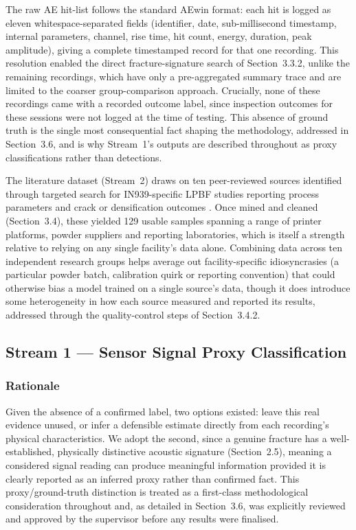 \documentclass[a4paper]{article}
\begin{document}
The raw AE hit-list follows the standard AEwin format: each hit is logged as eleven whitespace-separated fields (identifier, date, sub-millisecond timestamp, internal parameters, channel, rise time, hit count, energy, duration, peak amplitude), giving a complete timestamped record for that one recording. This resolution enabled the direct fracture-signature search of Section~3.3.2, unlike the remaining recordings, which have only a pre-aggregated summary trace and are limited to the coarser group-comparison approach. Crucially, none of these recordings came with a recorded outcome label, since inspection outcomes for these sessions were not logged at the time of testing. This absence of ground truth is the single most consequential fact shaping the methodology, addressed in Section~3.6, and is why Stream~1's outputs are described throughout as proxy classifications rather than detections.

The literature dataset (Stream~2) draws on ten peer-reviewed sources identified through targeted search for IN939-specific LPBF studies reporting process parameters and crack or densification outcomes \citep{marchese2020,zhang2023,rodriguezbarber2023,hu2024,ozer2024,dogu2024,li2024,bae2025,chen2026,ding2026}. Once mined and cleaned (Section~3.4), these yielded 129 usable samples spanning a range of printer platforms, powder suppliers and reporting laboratories, which is itself a strength relative to relying on any single facility's data alone. Combining data across ten independent research groups helps average out facility-specific idiosyncrasies (a particular powder batch, calibration quirk or reporting convention) that could otherwise bias a model trained on a single source's data, though it does introduce some heterogeneity in how each source measured and reported its results, addressed through the quality-control steps of Section~3.4.2.

\subsection{Stream 1 --- Sensor Signal Proxy Classification}
\subsubsection{Rationale}
Given the absence of a confirmed label, two options existed: leave this real evidence unused, or infer a defensible estimate directly from each recording's physical characteristics. We adopt the second, since a genuine fracture has a well-established, physically distinctive acoustic signature (Section~2.5), meaning a considered signal reading can produce meaningful information provided it is clearly reported as an inferred proxy rather than confirmed fact. This proxy/ground-truth distinction is treated as a first-class methodological consideration throughout and, as detailed in Section~3.6, was explicitly reviewed and approved by the supervisor before any results were finalised.
\end{document}
